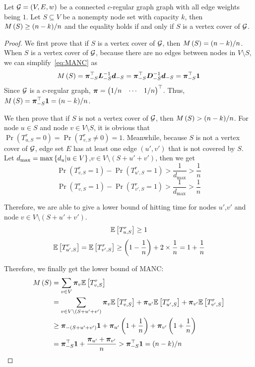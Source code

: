 \documentclass[sigconf]{acmart}
\begin{document}
\begin{lemma}\label{lem:reduct}
    Let \(\mathcal{G}=(V,E,w)\) be a connected \(c\)-regular graph graph with all edge weights being \(1\).
    Let \(S\subseteq V\) be a nonempty node set with capacity \(k\), then \(M\left(S\right)\ge (n-k)/n\) and the equality holds if and only if \(S\) is a vertex cover of \(\mathcal{G}\).
\end{lemma}
\begin{proof}
    We first prove that if \(S\) is a vertex cover of \(\mathcal{G}\), then \(M\left(S\right)=(n-k)/n\).
    When \(S\) is a vertex cover of \(\mathcal{G}\), because there are no edges between nodes in \(V\setminus S\), we can simplify~\eqref{eq:MANC} as
    \[M\left(S\right)=\boldsymbol{\pi}_{-S}^\top\boldsymbol{L}_{-S}^{-1}\boldsymbol{d}_{-S}=\boldsymbol{\pi}_{-S}^\top\boldsymbol{D}_{-S}^{-1}\boldsymbol{d}_{-S}=\boldsymbol{\pi}_{-S}^\top\boldsymbol{1}\]
    Since \(\mathcal{G}\) is a \(c\)-regular graph, \(\boldsymbol{\pi}=\begin{pmatrix}1/n&\cdots&1/n\end{pmatrix}^\top\).
    Thus, \(M\left(S\right)=\boldsymbol{\pi}_{-S}^\top\boldsymbol{1}=(n-k)/n\).

    We then prove that if \(S\) is not a vertex cover of \(\mathcal{G}\), then \(M\left(S\right)>(n-k)/n\).
    For node \(u\in S\) and node \(v\in V\setminus S\), it is obvious that \(\Pr(T_{u,S}^r=0)=\Pr(T_{v,S}^r\neq0)=1\).
    Meanwhile, because \(S\) is not a vertex cover of \(\mathcal{G}\), edge set \(E\) has at least one edge \((u',v')\) that is not covered by \(S\).
    Let \(d_{\max}=\max\left\{d_u|u\in V \right\}\),\(v\in V\setminus(S+u'+v')\), then we get
    \[\Pr(T_{v,S}^r=1)-\Pr(T_{u',S}^r=1)>\frac{1}{d_{\max}}>\frac{1}{n}\]
    \[\Pr(T_{v,S}^r=1)-\Pr(T_{v',S}^r=1)>\frac{1}{d_{\max}}>\frac{1}{n}\]

    Therefore, we are able to give a lower bound of hitting time for nodes \(u'\),\(v'\) and node \(v\in V\setminus(S+u'+v')\).
    \[\mathbb{E}\left[T_{u,S}^r\right]\ge1\]
    \[\mathbb{E}\left[T_{u',S}^r\right]=\mathbb{E}\left[T_{v',S}^r\right]\ge\left( 1-\frac1n \right)+2\times\frac1n=1+\frac1n\]

    Therefore, we finally get the lower bound of MANC:
    \begin{align*}
        M\left(S\right) & =\sum_{v\in V}\boldsymbol{\pi}_v\mathbb{E}\left[T_{v,S}^r\right]                                                                             \\
                 & =\sum_{v\in V\setminus(S+u'+v')}\boldsymbol{\pi}_v\mathbb{E}\left[T_{v,S}^r\right]+\boldsymbol{\pi}_{u'}\mathbb{E}\left[T_{u',S}^r\right]+\boldsymbol{\pi}_{v'}\mathbb{E}\left[T_{v',S}^r\right] \\
                 & \ge\boldsymbol{\pi}_{-(S+u'+v')}\boldsymbol{1}+\boldsymbol{\pi}_{u'}\left( 1+\frac{1}{n} \right)+\boldsymbol{\pi}_{v'}\left( 1+\frac{1}{n} \right)                    \\
                 & =\boldsymbol{\pi}_{-S}^\top\boldsymbol{1}+\frac{\boldsymbol{\pi}_{u'}+\boldsymbol{\pi}_{v'}}n
        >\boldsymbol{\pi}_{-S}^\top\boldsymbol{1}=(n-k)/n
    \end{align*}
\end{proof}
\end{document}
